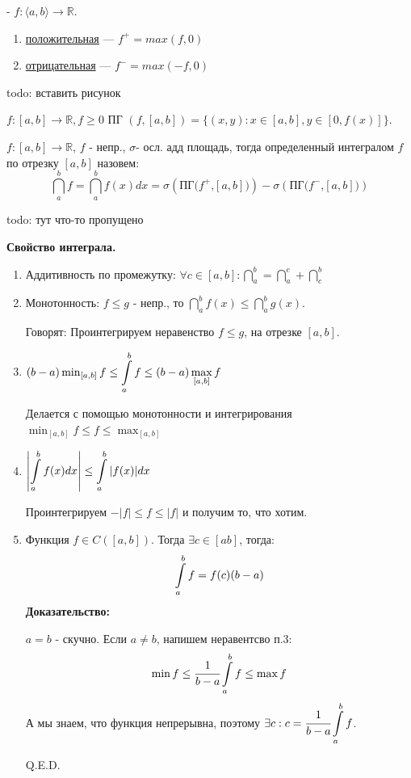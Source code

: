   - $f:\langle a,b\rangle \rightarrow \mathbb{R} $.
\begin{enumerate}
    \item \uline{положительная} --- $f^+ = max(f,0)$
    \item \uline{отрицательная} --- $f^- = max(-f,0)$
\end{enumerate}

todo: вставить рисунок

 $f:[a,b] \rightarrow \mathbb{R}, f\geq 0$ ПГ $(f,[a,b]) = \{(x,y): x\in [a,b], y \in [0,f(x)]\}$.

 $f: [a,b] \rightarrow \mathbb{R}$, $f$ - непр., $\sigma $- осл. адд площадь, тогда определенный интегралом $f$ по отрезку $[a,b]$ назовем: $$\dint\limits_{a}^b f =\dint\limits_{a}^b f(x) dx =\sigma(\text{ПГ($f^+$,$[a,b]$)})-\sigma(\text{ПГ($f^-$,$[a,b]$)})$$

todo: тут что-то пропущено

\textbf{Свойство интеграла.}
\begin{enumerate}
    \item Аддитивность по промежутку: $\forall c \in [a,b]:\dint\limits_{a}^b =\dint\limits_{a}^c + \dint\limits_{c}^b $
    \item Монотонность: $f\leq g$ - непр., то $\dint\limits_{a}^b f(x)\leq \dint\limits_{a}^b g(x)$. 

    Говорят: Проинтегрируем неравенство $f\leq g$, на отрезке $[a,b]$.

    \item $(b-a)\min_{[a,b]} f \leq\displaystyle\int\limits_{a}^{b}f\leq (b-a)\max_{[a,b]}f$

    Делается с помощью монотонности и интегрирования $\min_{[a,b]}f\leq f\leq\max_{[a,b]}$

    \item $\left|\displaystyle\int\limits_{a}^{b}f(x)dx\right|\leq \displaystyle\int\limits_{a}^{b}|f(x)|dx$

    Проинтегрируем $-|f|\leq f\leq |f|$ и получим то, что хотим.

    \item {}

    Функция $f \in C([a,b])$. Тогда $\exists c \in [ab]$, тогда:
    $$\displaystyle\int\limits_{a}^{b}f = f(c)(b-a)$$
    \textbf{Доказательство:} 
    
    $a=b$ - скучно. Если $a\neq b$, напишем неравентсво п.3:
    $$\min f\leq \cfrac{1}{b-a}\displaystyle\int\limits_{a}^{b}f\leq \max f$$ А мы знаем, что функция непрерывна, поэтому $\exists c: c = \cfrac{1}{b-a}\displaystyle\int\limits_{a}^{b}f$. 
    
    \hfill Q.E.D.
\end{enumerate}

